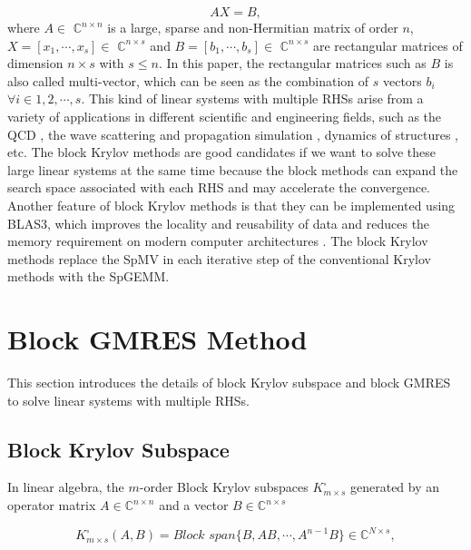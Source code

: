\begin{equation}
\label{AX=B}
AX =  B,
\end{equation}
where $A \in$ $\mathbb{C}^{n \times n}$ is a large, sparse and non-Hermitian matrix of order $n$, $X=[x_1,\cdots,x_s] \in$  $\mathbb{C}^{n \times s}$ and $B=[b_1,\cdots,b_s] \in$  $\mathbb{C}^{n \times s}$ are rectangular matrices of dimension $n \times s$ with $s \leq n$. In this paper, the rectangular matrices such as $B$ is also called multi-vector, which can be seen as the combination of $s$ vectors $b_i$ $\forall i \in 1, 2, \cdots, s$. This kind of linear systems with multiple RHSs arise from a variety of applications in different scientific and engineering fields, such as the QCD \cite{sakurai2010application, nakamura2012modified, fiebach1997variants}, the wave scattering and propagation simulation \cite{malhotra1997iterative}, dynamics of structures \cite{barbella2011block, ferraz2001block, nour1985short}, etc. The block Krylov methods are good candidates if we want to solve these large linear systems at the same time because the block methods can expand the search space associated with each RHS and may accelerate the convergence. Another feature of block Krylov methods is that they can be implemented using BLAS3, which improves the locality and reusability of data and reduces the memory requirement on modern computer architectures \cite{agullo2014block}. The block Krylov methods replace the SpMV in each iterative step of the conventional Krylov methods with the SpGEMM.


\section{Block GMRES Method}

This section introduces the details of block Krylov subspace and block GMRES to solve linear systems with multiple RHSs.

\subsection{Block Krylov Subspace}

In linear algebra, the $m$-order Block Krylov subspaces $K_{m\times s}^{\square}$ \cite{gutknecht2006block} generated by an operator matrix $A \in \mathbb{C}^{n\times n}$ and a vector $B \in \mathbb{C}^{n\times s}$ 

\begin{equation}
K_{m\times s}^{\square}(A,B)=\textit{Block span}\{B, AB, \cdots, A^{n-1}B\} \in \mathbb{C}^{N \times s},
\end{equation}

